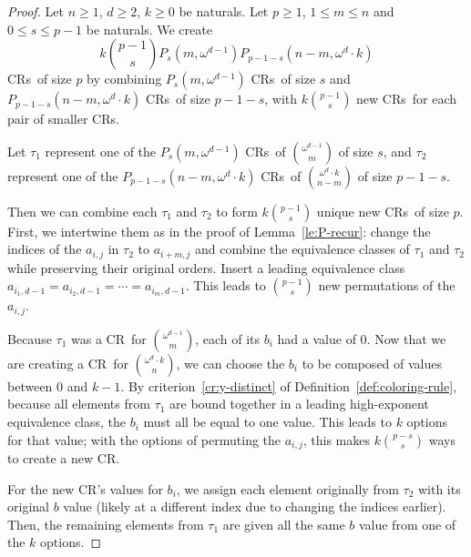 \documentclass[10pt,a4paper]{article}
\newcommand{\om}{\omega}
\newcommand{\crulenospace}{CR}
\newcommand{\crule}{\crulenospace~}
\newcommand{\crules}{\crulenospace s~}
\newcommand{\crulesnospace}{\crulenospace s}
\newcommand{\numpoints}{n}
\newcommand{\inumpoints}{i}
\newcommand{\idegr}{j}
\newcommand{\commonconst}{a}
\newcommand{\rareconst}{b}
\theoremstyle{plain}
\theoremstyle{definition}
\begin{document}
\begin{proof}
Let $\numpoints \geq 1$, $d \geq 2$, $k \geq 0$ be naturals. Let $p \geq 1$, $1 \leq m \leq \numpoints$ and $0 \leq s \leq p-1$ be naturals.
We create $$k \binom{p-1}{s} P_s \left( m,\om^{d-1} \right) P_{p-1-s} \left( \numpoints-m,\om^d \cdot k\right)$$ \crules of size $p$ by combining $P_s \left( m,\om^{d-1} \right)$ \crules of size $s$ and $P_{p-1-s} \left( \numpoints-m,\om^d \cdot k\right)$ \crules of size $p-1-s$, with $k \binom{p-1}{s}$ new \crules for each pair of smaller \crulesnospace.

Let $\tau_1$ represent one of the $P_s\left(m, \om^{d-1}\right)$ \crules of $\binom{\om^{d-1}}{m}$ of size $s$, and $\tau_2$ represent one of the $P_{p-1-s}\left(\numpoints-m, \om^d \cdot k\right)$ \crules of $\binom{\om^{d} \cdot k}{\numpoints-m}$ of size $p-1-s$. 

Then we can combine each $\tau_1$ and $\tau_2$ to form $k \binom{p-1}{s}$ unique new \crules of size $p.$ First, we intertwine them as in the proof of Lemma~\ref{le:P-recur}: change the indices of the $\commonconst_{\inumpoints,\idegr}$ in $\tau_2$ to $\commonconst_{\inumpoints+m,\idegr}$ and combine the equivalence classes of $\tau_1$ and $\tau_2$ while preserving their original orders. Insert a leading equivalence class $\commonconst_{\inumpoints_1,d-1} = \commonconst_{\inumpoints_2,d-1} = \cdots = \commonconst_{\inumpoints_m,d-1}.$ This leads to $\binom{p-1}{s}$ new permutations of the $\commonconst_{\inumpoints,\idegr}$.

Because $\tau_1$ was a \crule for $\binom{\om^{d-1}}{m}$, each of its $\rareconst_{\inumpoints}$ had a value of 0. Now that we are creating a 
\crule for $\binom{\om^d \cdot k}{\numpoints}$, we can choose the $\rareconst_{\inumpoints}$ to be
composed of values between 0 and $k-1$. By criterion~\ref{cr:y-distinct} of Definition~\ref{def:coloring-rule}, because all elements from $\tau_1$ are bound together in a leading high-exponent equivalence class, the $\rareconst_{\inumpoints}$ must all be equal to one value. This leads to $k$ options for that value; with the options of permuting the $\commonconst_{\inumpoints,\idegr}$, this makes $k \binom{p-s}{s}$ ways to create a new \crulenospace.

For the new \crulenospace's values for $\rareconst_{\inumpoints}$, we assign each element originally from $\tau_2$ with its original $\rareconst$ value (likely at a different index due to changing the indices earlier). Then, the remaining elements from $\tau_1$ are given all the same 
$\rareconst$
value from one of the $k$ options.


\end{proof}
\end{document}
